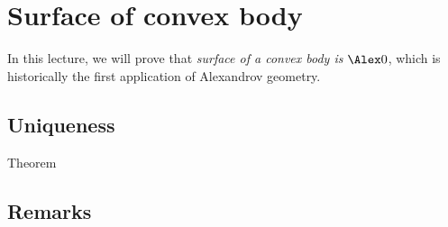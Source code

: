 \chapter{Surface of convex body}\label{chap:convex-body}

In this lecture, we will prove that \textit{surface of a convex body is $\Alex0$},
which is historically the first application of Alexandrov geometry.



\section{Uniqueness}

\begin{thm}{Theorem}

\end{thm}







\section{Remarks}


